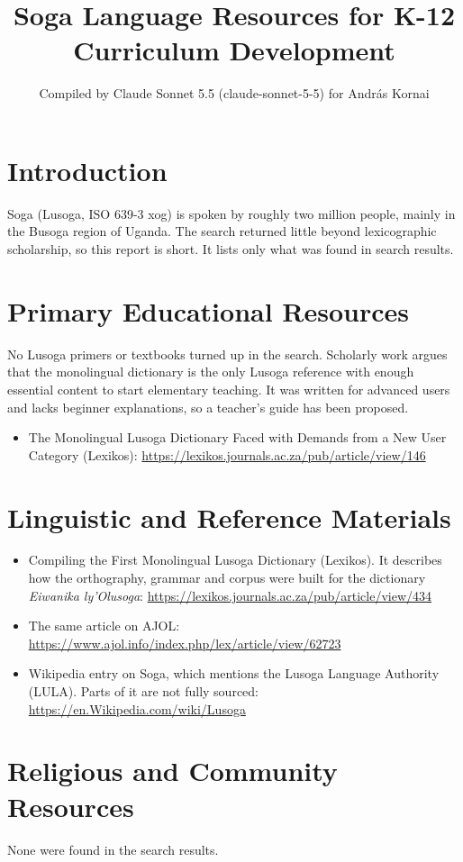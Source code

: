 \documentclass[12pt]{article}
\title{Soga Language Resources for K-12 Curriculum Development}
\author{Compiled by Claude Sonnet 5.5 (claude-sonnet-5-5) for Andr\'as Kornai}
\date{}
\begin{document}
\maketitle

\section{Introduction}
Soga (Lusoga, ISO 639-3 xog) is spoken by roughly two million people, mainly in the Busoga region of Uganda. The search returned little beyond lexicographic scholarship, so this report is short. It lists only what was found in search results.

\section{Primary Educational Resources}
No Lusoga primers or textbooks turned up in the search. Scholarly work argues that the monolingual dictionary is the only Lusoga reference with enough essential content to start elementary teaching. It was written for advanced users and lacks beginner explanations, so a teacher's guide has been proposed.
\begin{itemize}
\item The Monolingual Lusoga Dictionary Faced with Demands from a New User Category (Lexikos): \url{https://lexikos.journals.ac.za/pub/article/view/146}
\end{itemize}

\section{Linguistic and Reference Materials}
\begin{itemize}
\item Compiling the First Monolingual Lusoga Dictionary (Lexikos). It describes how the orthography, grammar and corpus were built for the dictionary \emph{Eiwanika ly'Olusoga}: \url{https://lexikos.journals.ac.za/pub/article/view/434}
\item The same article on AJOL: \url{https://www.ajol.info/index.php/lex/article/view/62723}
\item Wikipedia entry on Soga, which mentions the Lusoga Language Authority (LULA). Parts of it are not fully sourced: \url{https://en.Wikipedia.com/wiki/Lusoga}
\end{itemize}

\section{Religious and Community Resources}
None were found in the search results.
\end{document}
